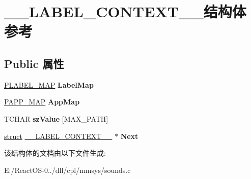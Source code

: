 \hypertarget{struct_____l_a_b_e_l___c_o_n_t_e_x_t____}{}\section{\+\_\+\+\_\+\+L\+A\+B\+E\+L\+\_\+\+C\+O\+N\+T\+E\+X\+T\+\_\+\+\_\+结构体 参考}
\label{struct_____l_a_b_e_l___c_o_n_t_e_x_t____}
\subsection*{Public 属性}
\begin{DoxyCompactItemize}
\item 
\mbox{\label{struct_____l_a_b_e_l___c_o_n_t_e_x_t_____a25a894eb553ca0496d44e204185ed114}} 
\hyperlink{struct_____l_a_b_e_l___m_a_p____}{P\+L\+A\+B\+E\+L\+\_\+\+M\+AP} {\bfseries Label\+Map}
\item 
\mbox{\label{struct_____l_a_b_e_l___c_o_n_t_e_x_t_____a30d4567efbb7e0c75e6d38d2de3cef3f}} 
\hyperlink{struct_____a_p_p___m_a_p____}{P\+A\+P\+P\+\_\+\+M\+AP} {\bfseries App\+Map}
\item 
\mbox{\label{struct_____l_a_b_e_l___c_o_n_t_e_x_t_____a83d98330511261bdbb4f2091315a392f}} 
T\+C\+H\+AR {\bfseries sz\+Value} \mbox{[}M\+A\+X\+\_\+\+P\+A\+TH\mbox{]}
\item 
\mbox{\label{struct_____l_a_b_e_l___c_o_n_t_e_x_t_____a25487876cc584cb683bf108a97d80cb5}} 
\hyperlink{interfacestruct}{struct} \hyperlink{struct_____l_a_b_e_l___c_o_n_t_e_x_t____}{\+\_\+\+\_\+\+L\+A\+B\+E\+L\+\_\+\+C\+O\+N\+T\+E\+X\+T\+\_\+\+\_\+} $\ast$ {\bfseries Next}
\end{DoxyCompactItemize}


该结构体的文档由以下文件生成\+:\begin{DoxyCompactItemize}
\item 
E\+:/\+React\+O\+S-\/0../dll/cpl/mmsys/sounds.\+c\end{DoxyCompactItemize}
